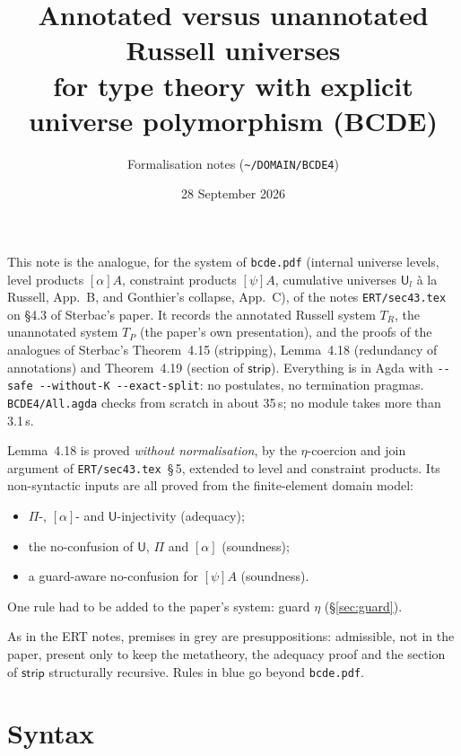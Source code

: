 \documentclass[10pt]{article}
\title{Annotated versus unannotated Russell universes\\
for type theory with explicit universe polymorphism (BCDE)}
\author{Formalisation notes (\texttt{\textasciitilde/DOMAIN/BCDE4})}
\date{28 September 2026}
\newcommand{\pre}[1]{{\color{gray}#1}}  %
\newcommand{\new}[1]{{\color{blue!70!black}#1}}  %
\newcommand{\U}{\mathsf{U}}
\newcommand{\strip}{\mathsf{strip}}
\newcommand{\TR}{T_R}
\newcommand{\TP}{T_P}
\newcommand{\grd}[2]{[#1]#2}
\newcommand{\lpi}[1]{[\alpha]#1}
\newcommand{\agda}[1]{\texttt{#1}}
\theoremstyle{remark}
\begin{document}
\sloppy
\maketitle

\noindent
This note is the analogue, for the system of \texttt{bcde.pdf}
(internal universe levels, level products $\lpi A$, constraint products
$\grd\psi A$, cumulative universes $\U_l$ à la Russell, App.~B, and
Gonthier's collapse, App.~C), of the notes \texttt{ERT/sec43.tex} on §4.3
of Sterbac's paper.  It records the annotated Russell system $\TR$, the
unannotated system $\TP$ (the paper's own presentation), and the proofs of
the analogues of Sterbac's Theorem~4.15 (stripping), Lemma~4.18
(redundancy of annotations) and Theorem~4.19 (section of $\strip$).
Everything is in Agda with \verb|--safe --without-K --exact-split|: no
postulates, no termination pragmas.  \agda{BCDE4/All.agda} checks from scratch
in about 35\,s; no module takes more than 3.1\,s.

Lemma~4.18 is proved \emph{without normalisation}, by the $\eta$-coercion and join
argument of \texttt{ERT/sec43.tex}~§\,5, extended to level and constraint
products.  Its non-syntactic inputs are all proved from the finite-element
domain model:
\begin{itemize}
\item $\Pi$-, $[\alpha]$- and $\U$-injectivity (adequacy);
\item the no-confusion of $\U$, $\Pi$ and $[\alpha]$ (soundness);
\item a guard-aware no-confusion for $\grd\psi A$ (soundness).
\end{itemize}
One rule had to be added to the paper's system: \new{guard $\eta$}
(\S\ref{sec:guard}).

As in the ERT notes, premises in \pre{grey} are presuppositions:
admissible, not in the paper, present only to keep the metatheory, the
adequacy proof and the section of $\strip$ structurally recursive.
Rules in \new{blue} go beyond \texttt{bcde.pdf}.

\section{Syntax}
\end{document}
